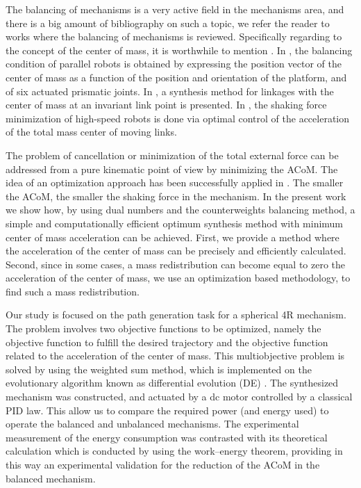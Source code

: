 \documentclass[11pt]{article}
\begin{document}
The balancing of mechanisms is a very active field in the mechanisms 
area, and there is a big amount of bibliography on such a topic, we 
refer the reader to works \cite{Lowen1983, Arakelian2005}  where the 
balancing of mechanisms is reviewed.  Specifically regarding to the 
concept of the center of mass, it is worthwhile to mention 
\cite{Rosario2005, Volkert2012, Arakelian2012}. In \cite{Rosario2005},  
the balancing condition of parallel robots is obtained by expressing the 
position vector of the  center of mass  as a function of the 
position and orientation of the platform, and of six actuated prismatic 
joints. In \cite{Volkert2012}, a  synthesis method for linkages with the 
center of mass at an invariant link point is presented. 
In \cite{Arakelian2012}, the shaking force minimization of high-speed 
robots is done via optimal control of the acceleration of the total mass 
center of moving links.

The problem of cancellation or minimization of the total external force 
can be addressed from a pure kinematic point of view by minimizing the 
ACoM. The idea of an optimization approach has 
been successfully applied in \cite{Pennestri1991,Li1992,Himanshu2007,
Subir2008,Saravanana2008}. The smaller the ACoM, the smaller the
shaking force in the mechanism. 
In the present work we show how, by using dual numbers \cite{Clif1873, 
Brodsky1999, Ettore2008} and the counterweights balancing method, a 
simple and computationally efficient optimum synthesis method with 
minimum center of mass acceleration can be achieved. First, we provide a 
method where the acceleration of the center of mass can be precisely and 
efficiently calculated. Second, since in some cases, a mass 
redistribution can become equal to zero the acceleration of the center 
of mass, we use an optimization based methodology, to find such a mass 
redistribution.

Our study is focused on the path generation task for a spherical 4R 
mechanism.  The problem involves two objective functions to be 
optimized, namely the objective function to fulfill the desired 
trajectory and the objective function related to the acceleration of the 
center of mass. This multiobjective problem is solved by using the 
weighted sum method, which is implemented on the evolutionary algorithm 
known as differential evolution (DE) \cite{Price_Storn2005}. The 
synthesized mechanism was constructed, and actuated by a dc motor 
controlled by a classical PID law. This allow us to compare the required 
power (and energy used) to operate the balanced and unbalanced 
mechanisms. The experimental measurement of the energy consumption was 
contrasted with its theoretical calculation which is conducted by using 
the work--energy theorem, providing in this way an experimental 
validation for the reduction of the ACoM in the balanced mechanism.
\end{document}
